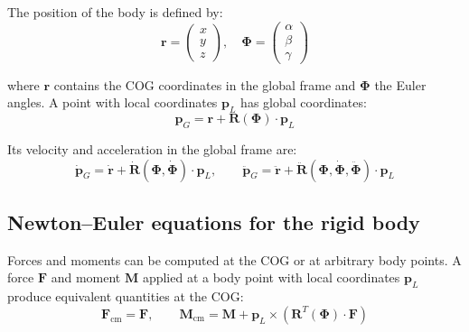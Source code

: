 \documentclass[11pt]{article}
\begin{document}
The position of the body is defined by:
\begin{equation}
\mathbf{r} = \begin{pmatrix} x \\ y \\ z \end{pmatrix}, \quad \boldsymbol{\Phi} = \begin{pmatrix} \alpha \\ \beta \\ \gamma \end{pmatrix}
\end{equation}

where $\mathbf{r}$ contains the COG coordinates in the global frame and $\boldsymbol{\Phi}$ the Euler angles. A point with local coordinates $\mathbf{p}_L$ has global coordinates:
\begin{equation}
\mathbf{p}_G = \mathbf{r} + \mathbf{R}(\boldsymbol{\Phi})\cdot\mathbf{p}_L
\end{equation}

Its velocity and acceleration in the global frame are:
\begin{equation}
\dot{\mathbf{p}}_G = \dot{\mathbf{r}} + \dot{\mathbf{R}}(\boldsymbol{\Phi},\dot{\boldsymbol{\Phi}})\cdot\mathbf{p}_L, \qquad \ddot{\mathbf{p}}_G = \ddot{\mathbf{r}} + \ddot{\mathbf{R}}(\boldsymbol{\Phi},\dot{\boldsymbol{\Phi}},\ddot{\boldsymbol{\Phi}})\cdot\mathbf{p}_L
\end{equation}

\subsection{Newton--Euler equations for the rigid body}

Forces and moments can be computed at the COG or at arbitrary body points. A force $\mathbf{F}$ and moment $\mathbf{M}$ applied at a body point with local coordinates $\mathbf{p}_L$ produce equivalent quantities at the COG:
\begin{equation}
\mathbf{F}_{\text{cm}} = \mathbf{F}, \qquad \mathbf{M}_{\text{cm}} = \mathbf{M} + \mathbf{p}_L \times \left(\mathbf{R}^T(\boldsymbol{\Phi})\cdot\mathbf{F}\right)
\end{equation}
\end{document}
